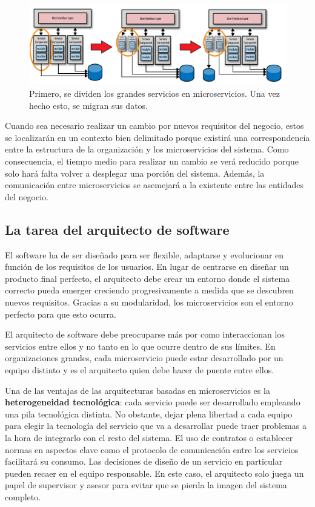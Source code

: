 \documentclass[11pt,spanish,listoffigures]{tfgetsinf}
\begin{document}
\begin{figure}[h]
\centering
\includegraphics[scale=0.4]{refactoring}
\caption{Primero, se dividen los grandes servicios en microservicios. Una vez hecho esto, se migran sus datos. \cite{Richards2016}}
\end{figure}

Cuando sea necesario realizar un cambio por nuevos requisitos del negocio, estos se localizarán en un contexto bien delimitado porque existirá una correspondencia entre la estructura de la organización y los microservicios del sistema. Como consecuencia, el tiempo medio para realizar un cambio se verá reducido porque solo hará falta volver a desplegar una porción del sistema. Además, la comunicación entre microservicios se asemejará a la existente entre las entidades del negocio.

\subsection{La tarea del arquitecto de software}

El software ha de ser diseñado para ser flexible, adaptarse y evolucionar en función de los requisitos de los usuarios. En lugar de centrarse en diseñar un producto final perfecto, el arquitecto debe crear un entorno donde el sistema correcto pueda emerger creciendo progresivamente a medida que se descubren nuevos requisitos. Gracias a su modularidad, los microservicios son el entorno perfecto para que esto ocurra.

El arquitecto de software debe preocuparse más por como interaccionan los servicios entre ellos y no tanto en lo que ocurre dentro de sus límites. En organizaciones grandes, cada microservicio puede estar desarrollado por un equipo distinto y es el arquitecto quien debe hacer de puente entre ellos. \cite{Newman2015a}

Una de las ventajas de las arquitecturas basadas en microservicios es la \textbf{heterogeneidad tecnológica}: cada servicio puede ser desarrollado empleando una pila tecnológica distinta. No obstante, dejar plena libertad a cada equipo para elegir la tecnología del servicio que va a desarrollar puede traer problemas a la hora de integrarlo con el resto del sistema. El uso de contratos o establecer normas en aspectos clave como el protocolo de comunicación entre los servicios facilitará su consumo. Las decisiones de diseño de un servicio en particular pueden recaer en el equipo responsable. En este caso, el arquitecto solo juega un papel de supervisor y asesor para evitar que se pierda la imagen del sistema completo.
\end{document}
